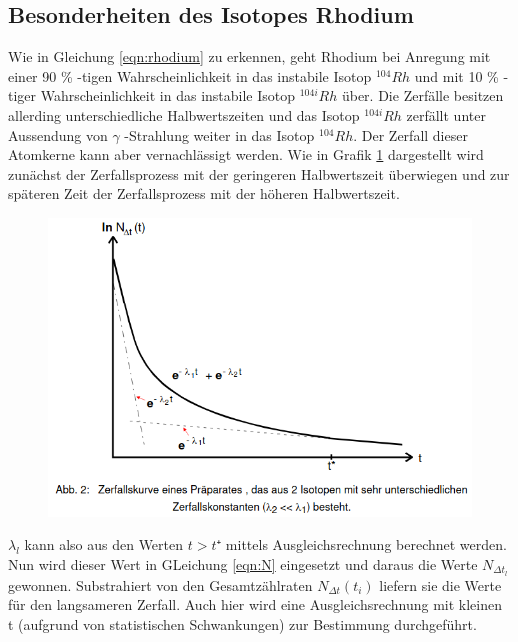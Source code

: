 \subsection{Besonderheiten des Isotopes Rhodium}
    Wie in Gleichung \ref{eqn:rhodium} zu erkennen, geht Rhodium bei Anregung mit einer 90 \% -tigen
    Wahrscheinlichkeit in das instabile Isotop $^{104}Rh$ und mit 10 \% -tiger Wahrscheinlichkeit 
    in das instabile Isotop $^{104i}Rh$ über. Die Zerfälle besitzen allerding unterschiedliche 
    Halbwertszeiten und das Isotop $^{104i}Rh$ zerfällt unter Aussendung von $\gamma$ -Strahlung 
    weiter in das Isotop $^{104}Rh$. Der Zerfall dieser Atomkerne kann aber vernachlässigt werden.
    Wie in Grafik \ref{fig:plot} dargestellt wird zunächst der Zerfallsprozess mit der geringeren Halbwertszeit
    überwiegen und zur späteren Zeit der Zerfallsprozess mit der höheren Halbwertszeit. 
    \begin{figure}[H]
        \centering
        \includegraphics[width=\textwidth]{Kurve.png}
        \label{fig:plot}
    \end{figure}
    $\lambda_l$ kann also aus den Werten $t > t⁺$ mittels Ausgleichsrechnung berechnet werden. 
    Nun wird dieser Wert in GLeichung \ref{eqn:N} eingesetzt und daraus die Werte $N_{\Delta t_l}$
    gewonnen. Substrahiert von den Gesamtzählraten $N_{\Delta t}(t_i)$ liefern sie die Werte für den 
    langsameren Zerfall. Auch hier wird eine Ausgleichsrechnung mit kleinen t (aufgrund von 
    statistischen Schwankungen) zur Bestimmung durchgeführt. 
    
